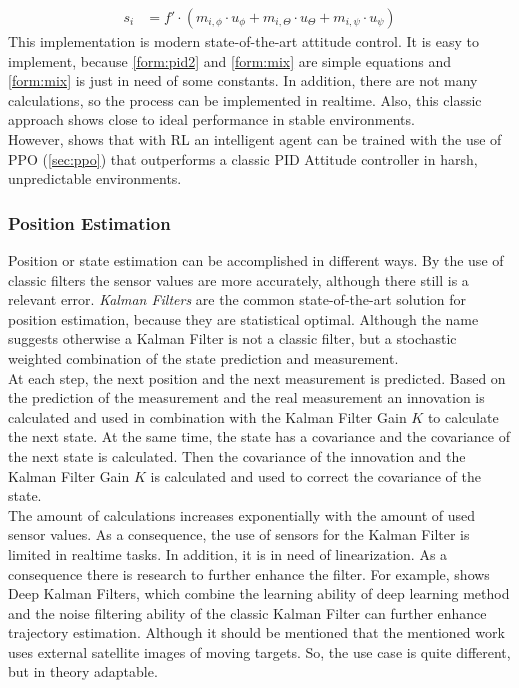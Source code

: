 \begin{align}
	s_i &= f' \cdot (m_{i,\phi} \cdot u_{\phi} + m_{i, \Theta} \cdot u_{\Theta} + m_{i,\psi} \cdot u_{\psi}) \label{form:mix}
\end{align}
\newline
This implementation is modern state-of-the-art attitude control. It is easy to implement, 
because \cref{form:pid2} and \cref{form:mix} are simple equations and \cref{form:mix} is just in need of some constants. 
In addition, there are not many calculations, so the process can be implemented in realtime. 
Also, this classic approach shows close to ideal performance in stable environments.\\
However, \cite{koch2019reinforcement} shows that with RL an intelligent agent can be trained with the use of PPO (\cref{sec:ppo}) 
that outperforms a classic PID Attitude controller in harsh, unpredictable environments. 

\newpage

\subsubsection{Position Estimation}
Position or state estimation can be accomplished in different ways. 
By the use of classic filters the sensor values are more accurately, although there still is a relevant error. 
\emph{Kalman Filters} are the common state-of-the-art solution for position estimation, because they are statistical optimal. 
Although the name suggests otherwise a Kalman Filter is not a classic filter, but a stochastic weighted combination of the state prediction and measurement. \\
At each step, the next position and the next measurement is predicted. 
Based on the prediction of the measurement and the real measurement an innovation is calculated and used in combination with the Kalman Filter Gain $K$ 
to calculate the next state. 
At the same time, the state has a covariance and the covariance of the next state is calculated. 
Then the covariance of the innovation and the Kalman Filter Gain $K$ is calculated and used to correct the covariance of the state.\\
The amount of calculations increases exponentially with the amount of used sensor values. As a consequence,
the use of sensors for the Kalman Filter is limited in realtime tasks. 
In addition, it is in need of linearization. As a consequence there is research to further enhance the filter.
For example, \cite{shi2022deep} shows Deep Kalman Filters, 
which combine the learning ability of deep learning method and the noise filtering ability of the classic Kalman Filter can further enhance trajectory estimation. 
Although it should be mentioned that the mentioned work uses external satellite images of moving targets. So, the use case is quite different, but in theory adaptable. 

